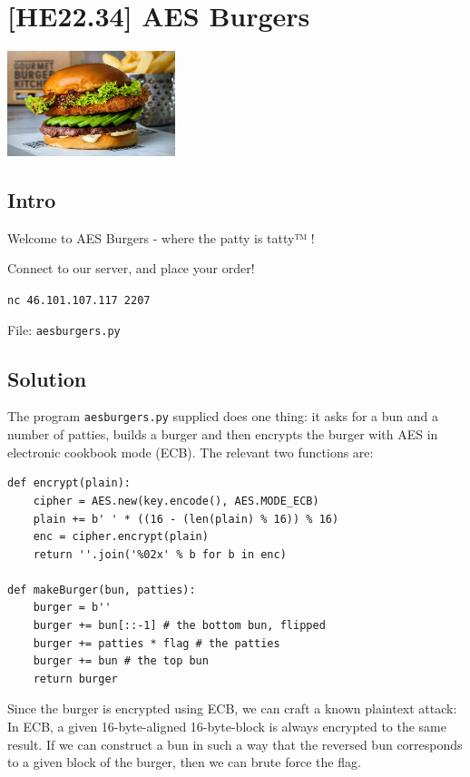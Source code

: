 
\hypertarget{he22.34}{%
\chapter{[HE22.34] AES Burgers}\label{he22.34}}

\begin{marginfigure}
	\includegraphics[width=49mm]{level8/challenge34.jpg}
\end{marginfigure}
\section{Intro}
Welcome to AES Burgers - where the patty is tatty™ !

\noindent Connect to our server, and place your order!

\noindent \verb+nc 46.101.107.117 2207+

\noindent File: \verb+aesburgers.py+


\section{Solution}\label{hv22.34solution}

The program \verb+aesburgers.py+ supplied does one thing: it asks for a bun and a number of patties, builds a burger and then encrypts the burger with AES in electronic cookbook mode (ECB).  The relevant two functions are:

{\small
\begin{verbatim}
def encrypt(plain):
    cipher = AES.new(key.encode(), AES.MODE_ECB)
    plain += b' ' * ((16 - (len(plain) % 16)) % 16)
    enc = cipher.encrypt(plain)
    return ''.join('%02x' % b for b in enc)

def makeBurger(bun, patties):
    burger = b''
    burger += bun[::-1] # the bottom bun, flipped
    burger += patties * flag # the patties
    burger += bun # the top bun
    return burger
\end{verbatim}
}

\noindent
Since the burger is encrypted using ECB, we can craft a known plaintext attack:
In ECB, a given 16-byte-aligned 16-byte-block is always encrypted to the same
result.  If we can construct a bun in such a way that the reversed bun
corresponds to a given block of the burger, then we can brute force the flag.

